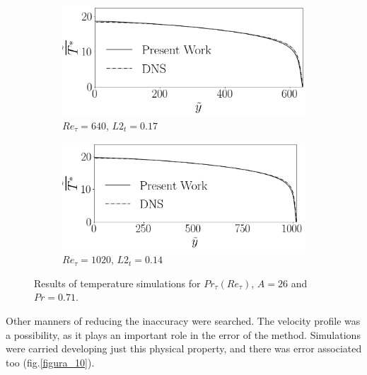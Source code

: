 \documentclass[10pt]{article} %
\begin{document}
\begin{figure}[!h]
	\begin{subfigure}[t]{0.5\textwidth}
		\centering
		\includegraphics[angle=0, scale=0.24]{fotos_formatacao_final/Temperature_640_071_Prt(Ret)_A26}
		\caption{$Re_\tau = 640$, $L2_t = 0.17$}
	\end{subfigure}
	\begin{subfigure}[t]{0.45\textwidth}
		\centering
		\includegraphics[angle=0, scale=0.24]{fotos_formatacao_final/Temperature_1000_071_Prt(Ret)_A26}
		\caption{$Re_\tau = 1020$, $L2_t = 0.14$}
	\end{subfigure}	
	\caption{Results of temperature simulations for $Pr_\tau(Re_\tau)$, $A = 26$ and $Pr =0.71$. }
	\label{figura_9}
\end{figure}

Other manners of reducing the inaccuracy were searched. The velocity profile was a possibility, as it plays an important role in the error of the method. Simulations were carried developing just this physical property, and there was error associated too (fig.\ref{figura_10}).
\end{document}
